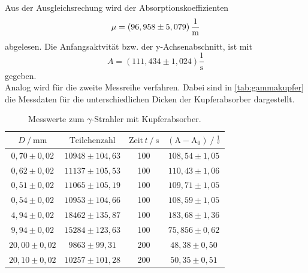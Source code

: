 Aus der Ausgleichsrechung wird der Absorptionskoeffizienten 
\begin{equation*}
    \mu =  \left( 96,958 \pm 5,079 \right) \unit{\dfrac{1}{\meter}}
\end{equation*}
abgelesen. 
Die Anfangsaktvität bzw. der y-Achsenabschnitt, ist mit 
\begin{equation*}
    A =  \left( 111,434 \pm 1,024 \right)  \dfrac{1}{\unit{\second}}
\end{equation*}
gegeben. \\

Analog wird für die zweite Messreihe verfahren.
Dabei sind in \autoref{tab:gammakupfer} die Messdaten für die unterschiedlichen Dicken der Kupferabsorber dargestellt.

\begin{table}[H]
    \centering
    \caption{Messwerte zum $\gamma$-Strahler mit Kupferabsorber.}
    \label{tab:gammakupfer}
    \begin{tabular}{S[table-format=2.2] S[table-format=5.0] S[table-format=3.0] S}
      \toprule
      {$D \mathbin{/} \unit{\milli\meter} $} & {$\text{Teilchenzahl}$} & {$\text{Zeit} \,t \mathbin{/} \unit{\second}$} &{$ \left(\text{A}- \text{A}_0 \right) \mathbin{/} \unit{\frac{1}{\second}}$} \\
      \midrule
      {$ 0,70 \pm 0,02$}          &    {$  10948 \pm 104,63    $} &      100  	& {$108,54  \pm 1,05$} \\
      {$ 0,62 \pm 0,02$}          &    {$  11137 \pm 105,53    $} &      100  	& {$110,43  \pm 1,06$} \\
      {$ 0,51 \pm 0,02$}          &    {$  11065 \pm 105,19    $} &      100  	& {$109,71  \pm 1,05$} \\
      {$ 0,54 \pm 0,02$}          &    {$  10953 \pm 104,66    $} &      100  	& {$108,59  \pm 1,05$} \\
      {$ 4,94 \pm 0,02$}          &    {$  18462 \pm 135,87    $} &      100  	& {$183,68  \pm 1,36$} \\
      {$ 9,94 \pm 0,02$}          &    {$  15284 \pm 123,63    $} &      100  	& {$75,856  \pm 0,62$} \\
      {$20,00 \pm 0,02$}          &    {$   9863 \pm 99,31     $} &      200  	& {$ 48,38  \pm 0,50$} \\
      {$20,10 \pm 0,02$}          &    {$  10257 \pm 101,28    $} &      200  	& {$ 50,35  \pm 0,51$} \\
      \bottomrule
    \end{tabular}
  \end{table}


